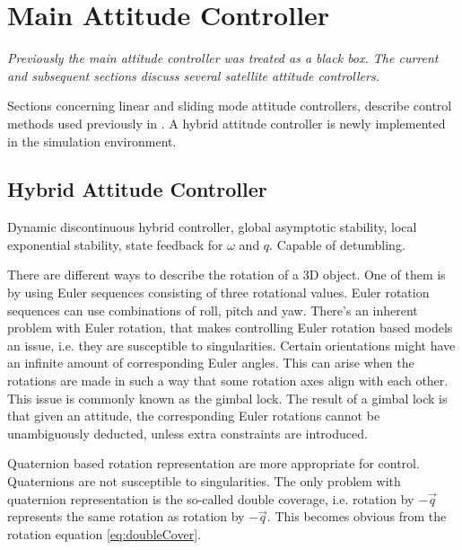 \section{Main Attitude Controller}
\label{sec:mainCont}

\textit{Previously the main attitude controller was treated as a black box. The current and subsequent sections discuss several satellite attitude controllers.}

Sections concerning linear and sliding mode attitude controllers, describe control methods used previously in \cite{PrevPro}. A hybrid attitude controller is newly implemented in the simulation environment.


\subsection{Hybrid Attitude Controller}

Dynamic discontinuous hybrid controller, global asymptotic stability, local exponential stability, state feedback for $\omega$ and $q$. Capable of detumbling. \cite{globalAttController}

There are different ways to describe the rotation of a 3D object. One of them is by using Euler sequences consisting of three rotational values. Euler rotation sequences can use combinations of roll, pitch and yaw. There's an inherent problem with Euler rotation, that makes controlling Euler rotation based models an issue, i.e. they are susceptible to singularities. Certain orientations might have an infinite amount of corresponding Euler angles. This can arise when the rotations are made in such a way that some rotation axes align with each other. This issue is commonly known as the gimbal lock. The result of a gimbal lock is that given an attitude, the corresponding Euler rotations cannot be unambiguously deducted, unless extra constraints are introduced.

Quaternion based rotation representation are more appropriate for control. Quaternions are not susceptible to singularities. The only problem with quaternion representation is the so-called double coverage, i.e. rotation by $-\vec{q}$ represents the same rotation as rotation by $-\vec{q}$. This becomes obvious from the rotation equation \ref{eq:doubleCover}.

